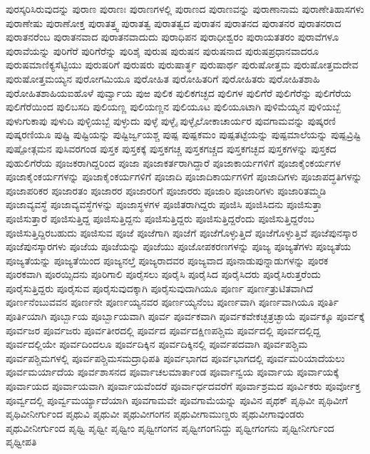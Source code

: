 {ಪುರಸ್ಕರಿಸಿರುವುದನ್ನು
ಪುರಾಣ
ಪುರಾಣಃ
ಪುರಾಣಗಳಲ್ಲಿ
ಪುರಾಣದ
ಪುರಾಣವನ್ನು
ಪುರಾಣಾನಾಮ
ಪುರಾಣೇತಿಹಾಸಗಳು
ಪುರಾಣೇಷು
ಪುರಾಣೋಕ್ತ
ಪುರಾತತ್ತ್ವ
ಪುರಾತತ್ವ
ಪುರಾತತ್ವದ
ಪುರಾತನ
ಪುರಾತನದ
ಪುರಾತನರ
ಪುರಾತನರಾದ
ಪುರಾತನರೆಂಬ
ಪುರಾತನವಾದ
ಪುರಾತನವಾದುದು
ಪುರಾಧಿಪನ
ಪುರಾಧೀಶ್ವರಂ
ಪುರಾಯತತರಂ
ಪುರಾವೆಗಳೂ
ಪುರಾವೆಯನ್ನು
ಪುರಿಗೆರೆ
ಪುರಿಗೆರೆನ್ನು
ಪುರಿಶೈ
ಪುರುಷ
ಪುರುಷನ
ಪುರುಷನಾದ
ಪುರುಷಪ್ರಧಾನವಾದರೂ
ಪುರುಷಮಾಣಿಕ್ಯಸೆಟ್ಟಿಯು
ಪುರುಷರಿಗೆ
ಪುರುಷರು
ಪುರುಷಾರ್ತ್ಥ
ಪುರುಷಾರ್ಥ
ಪುರುಷೋತ್ತಮ
ಪುರುಷೋತ್ತಮದೇವ
ಪುರುಷೋತ್ತಮಯ್ಯನ
ಪುರೋಗಮಿಯೂ
ಪುರೋಹಿತ
ಪುರೋಹಿತರಿಗೆ
ಪುರೋಹಿತರು
ಪುರೋಹಿತಶಾಹಿ
ಪುರೋಹಿತಶಾಹಿಯಐಹೊಳೆ
ಪುರ್ವ್ವಾಯ
ಪುಱ
ಪುಲಿಕ
ಪುಲಿಕಗಚ್ಛದ
ಪುಲಿಗಳ
ಪುಲಿಗೆರೆ
ಪುಲಿಗೆರೆನ್ನು
ಪುಲಿಗೆರೆಯ
ಪುಲಿಗೆರೆಯಿಂದ
ಪುಲಿಬಸದಿ
ಪುಲಿಯಣ್ಣ
ಪುಲಿಯಣ್ಣನ
ಪುಲಿಯೂಟ
ಪುಲಿಯೂಟಾಗಿ
ಪುಳಿಮೆಯ್ಯನ
ಪುಳಿಯಬ್ಬೆ
ಪುಳುಗುಕಾಪು
ಪುಳುದಿ
ಪುಳ್ಳಿಯಬ್ಬೆ
ಪುಳ್ಳುದು
ಪುಳ್ಳೆ
ಪುಳ್ಳೈ
ಪುಳ್ಳೈಲೋಕಾಚಾರ್ಯರ
ಪುವಗಾಮವನ್ನು
ಪುಷ್ಕರಣಿ
ಪುಷ್ಕರಣಿಯೂ
ಪುಷ್ಟಿ
ಪುಷ್ಟಿಯನ್ನು
ಪುಷ್ಟಿರ್ಜ್ವಯಶ್ಚ
ಪುಷ್ಪ
ಪುಷ್ಪಕಮಂ
ಪುಷ್ಪತಟ್ಟೆಯನ್ನು
ಪುಷ್ಪಮಾಲೆಯನ್ನು
ಪುಷ್ಪವ್ರಿಷ್ಟಿ
ಪುಷ್ಪೋತ್ಗಮನ
ಪುಸಿವರಗಂಡ
ಪುಸ್ತಕ
ಪುಸ್ತಕಕ್ಕೆ
ಪುಸ್ತಕಗಚ್ಚ
ಪುಸ್ತಕಗಚ್ಚದ
ಪುಸ್ತಕಗಚ್ಛದ
ಪುಸ್ತಕಗಳನ್ನು
ಪುಸ್ತಕದ
ಪುಹುಲಿಗೆರೆಯ
ಪೂಜಕರಾಗಿದ್ದರಿಂದ
ಪೂಜಾ
ಪೂಜಾಕರ್ತರಾಗಿದ್ದಾರೆ
ಪೂಜಾಕಾರ್ಯಗಳಿಗೆ
ಪೂಜಾಕೈಂಕರ್ಯಗಳ
ಪೂಜಾಕೈಂಕರ್ಯಗಳನ್ನು
ಪೂಜಾಕೈಂಕರ್ಯಗಳಿಗೆ
ಪೂಜಾದಿ
ಪೂಜಾದಿಕಾರ್ಯಗಳಿಗೆ
ಪೂಜಾದಿಗಳು
ಪೂಜಾಪದ್ಧತಿಗಳನ್ನು
ಪೂಜಾಪರಿಕರ
ಪೂಜಾರತಂ
ಪೂಜಾರರ
ಪೂಜಾರರಿಗೆ
ಪೂಜಾರರು
ಪೂಜಾರಿ
ಪೂಜಾರಿಗಳು
ಪೂಜಾರಿತಮ್ಮಡಿ
ಪೂಜಾವ್ಯವಸ್ಥೆ
ಪೂಜಾವ್ಯವಸ್ಥೆಗಳನ್ನು
ಪೂಜಾಸ್ಥಳಗಳ
ಪೂಜಿತರಾಗಿದ್ದರು
ಪೂಜಿಸಿ
ಪೂಜಿಸಿದನು
ಪೂಜಿಸುತ್ತಾ
ಪೂಜಿಸುತ್ತಾರೆ
ಪೂಜಿಸುತ್ತಿದ್ದ
ಪೂಜಿಸುತ್ತಿದ್ದನು
ಪೂಜಿಸುತ್ತಿದ್ದರು
ಪೂಜಿಸುತ್ತಿದ್ದರೆಂದು
ಪೂಜಿಸುತ್ತಿದ್ದರೆಂಬ
ಪೂಜಿಸುತ್ತಿದ್ದಿರಬಹುದು
ಪೂಜಿಸುವ
ಪೂಜೆ
ಪೂಜೆಗಾಗಿ
ಪೂಜೆಗೆ
ಪೂಜೆಗೊಳ್ಳುತ್ತಿದೆ
ಪೂಜೆಗೊಳ್ಳುತ್ತಿವೆ
ಪೂಜೆಪುನಸ್ಕಾರ
ಪೂಜೆಪುನಸ್ಕಾರಗಳು
ಪೂಜೆಯ
ಪೂಜೆಯನ್ನು
ಪೂಜೆಯು
ಪೂಜೋಪಕರಣಗಳನ್ನು
ಪೂಜ್ಯ
ಪೂಜ್ಯತೆಗಳು
ಪೂಜ್ಯತೆಯ
ಪೂಜ್ಯತೆಯನ್ನು
ಪೂಜ್ಯತೆಯಿಂದ
ಪೂಜ್ಯನಲ್ತೆ
ಪೂಜ್ಯರಾದವರ
ಪೂಜ್ಯವಾದ
ಪೂನಾಡುಪುನ್ನಾಡುಗಳನ್ನು
ಪೂರಕ
ಪೂರಕವಾಗಿ
ಪೂರಯ್ಸಿದನು
ಪೂರಿಗಾಲಿ
ಪೂರೈಸಲು
ಪೂರೈಸಿ
ಪೂರೈಸಿದ
ಪೂರೈಸಿದರು
ಪೂರೈಸಿರುತ್ತರೆಂದು
ಪೂರೈಸುತ್ತಿದ್ದರು
ಪೂರೈಸುವ
ಪೂರೈಸುವುದಕ್ಕಾಗಿ
ಪೂರೈಸುವುದಾಗಿಯೂ
ಪೂರ್ಣ
ಪೂರ್ಣತ್ರುಟಿತವಾಗಿದೆ
ಪೂರ್ಣನೆಂಬುವವನ
ಪೂರ್ಣನೇ
ಪೂರ್ಣಯ್ಯನವರ
ಪೂರ್ಣಯ್ಯನೆಂಬ
ಪೂರ್ಣವಾಗಿ
ಪೂರ್ಣವಾಗಿಯೂ
ಪೂರ್ತಿ
ಪೂರ್ತಿಯಾಗಿ
ಪೂರ್ಬ್ಬಾಯ
ಪೂರ್ಬ್ಬಾಯವಾಗಿ
ಪೂರ್ವ
ಪೂರ್ವಕವಾಗಿ
ಪೂರ್ವಕವೇಕಚ್ಛತ್ರಚ್ಛಾಯೆ
ಪೂರ್ವಕ್ಕೂ
ಪೂರ್ವಕ್ಕೆ
ಪೂರ್ವಜರ
ಪೂರ್ವಜರು
ಪೂರ್ವತೀರದಲ್ಲಿ
ಪೂರ್ವದ
ಪೂರ್ವದಕ್ಷಿಣಪಶ್ಚಿಮ
ಪೂರ್ವದಲ್ಲಿ
ಪೂರ್ವದಲ್ಲಿದ್ದ
ಪೂರ್ವದಲ್ಲಿಯೇ
ಪೂರ್ವದಿಂದಲೂ
ಪೂರ್ವದಿಕ್ಕಿನ
ಪೂರ್ವದಿಕ್ಕಿನಲ್ಲಿ
ಪೂರ್ವಪದವಾಗಿ
ಪೂರ್ವಪಶ್ಚಿಮ
ಪೂರ್ವಪಶ್ಚಿಮಗಳಲ್ಲಿ
ಪೂರ್ವಪಶ್ಚಿಮಸಮದ್ರಾಧಿಪತಿ
ಪೂರ್ವಭಾಗದ
ಪೂರ್ವಭಾಗದಲ್ಲಿ
ಪೂರ್ವಮರಿಯಾದೆಯಲು
ಪೂರ್ವಮರ್ಯಾದೆಯ
ಪೂರ್ವಶಾಸನದ
ಪೂರ್ವಾಚಲಮಾರ್ತಾಂಡ
ಪೂರ್ವಾನ್ವಯ
ಪೂರ್ವಾಯ
ಪೂರ್ವಾಯಕ್ಕೆ
ಪೂರ್ವಾಯದ
ಪೂರ್ವಾಯವಾಗಿ
ಪೂರ್ವಾಯವೆಂದರೆ
ಪೂರ್ವಾರ್ಧದವರೆಗೆ
ಪೂರ್ವಾಶ್ರಮದ
ಪೂರ್ವಿಕರು
ಪೂರ್ವೋಕ್ತ
ಪೂರ್ವ್ವದಲ್ಲಿ
ಪೂರ್ವ್ವಮರ್ಯ್ಯಾದೆಯಾಗಿ
ಪೂವಗಾಮವೇ
ಪೂವಗಾಮೆಯನ್ನು
ಪೂವಿನ
ಪೃಥಕ್
ಪೃಥಿವೀ
ಪೃಥಿವೀಗೆ
ಪೃಥಿವೀನೀರ್ಗುಂದ
ಪೃಥುವಿ
ಪೃಥುವೀ
ಪೃಥುವೀಗಂಗನ
ಪೃಥುವೀಗಾಮುಣ್ಡರು
ಪೃಥುವೀಗಾವುಂಡರು
ಪೃಥುವೀನೀರ್ಗುಂದ
ಪೃಥ್ವಿ
ಪೃಥ್ವೀ
ಪೃಥ್ವೀಂ
ಪೃಥ್ವೀಗಂಗನ
ಪೃಥ್ವೀಗಂಗನಿದ್ದು
ಪೃಥ್ವೀಗಂಗನು
ಪೃಥ್ವೀನೀರ್ಗುಂದ
ಪೃಥ್ವೀಪತಿ
}
